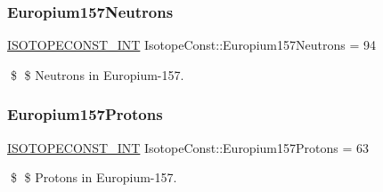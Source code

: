\subsubsection{\texorpdfstring{Europium157\+Neutrons}{Europium157Neutrons}}
{\footnotesize\ttfamily \mbox{\hyperlink{group___isotope_const-_macros_ga5f18360b3e99483a35c32d789e62621c}{I\+S\+O\+T\+O\+P\+E\+C\+O\+N\+S\+T\+\_\+\+I\+NT}} Isotope\+Const\+::\+Europium157\+Neutrons = 94}

\$ \$ Neutrons in Europium-\/157. \mbox{\label{group___isotope_const-_europium-_eu157_gaf3c3a81b0761f142f0dbd9b5f89ee636}} 
\subsubsection{\texorpdfstring{Europium157\+Protons}{Europium157Protons}}
{\footnotesize\ttfamily \mbox{\hyperlink{group___isotope_const-_macros_ga5f18360b3e99483a35c32d789e62621c}{I\+S\+O\+T\+O\+P\+E\+C\+O\+N\+S\+T\+\_\+\+I\+NT}} Isotope\+Const\+::\+Europium157\+Protons = 63}

\$ \$ Protons in Europium-\/157. 